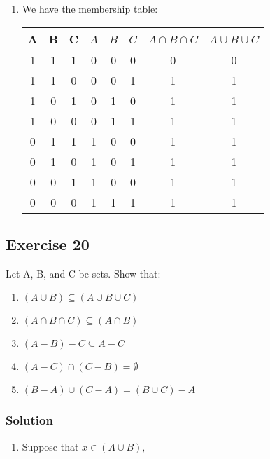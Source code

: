 \documentclass{article}
\theoremstyle{mytheoremstyle}
\theoremstyle{mytheoremstyle}
\theoremstyle{myproblemstyle}
\begin{document}
\begin{enumerate} [label = (\alph*)]
            Because we have proved that \(\overline{A \cap B \cap C} \subseteq \overline{A} \cup \overline{B} \cup \overline{C}\) and \(\overline{A} \cup \overline{B} \cup \overline{C} \subseteq \overline{A \cap B \cap C}\) so that
            we can infer \(\overline{A \cap B \cap C} = \overline{A} \cup \overline{B} \cup \overline{C}\).
            \item We have the membership table:\\
                \begin{center}
                    \begin{tabular}{|c|c|c|c|c|c|c|c|}
                        \hline 
                        A & B & C & \(\overline{A}\) & \(\overline{B}\) & \(\overline{C}\) & \(\overline{A \cap B \cap C}\) & \(\overline{A} \cup \overline{B} \cup \overline{C}\)\\
                        \hline 
                        1 & 1 & 1 & 0 & 0 & 0 & 0 & 0\\
                        \hline
                        1 & 1 & 0 & 0 & 0 & 1 & 1 & 1\\
                        \hline 
                        1 & 0 & 1 & 0 & 1 & 0 & 1 & 1\\
                        \hline
                        1 & 0 & 0 & 0 & 1 & 1 & 1 & 1\\
                        \hline
                        0 & 1 & 1 & 1 & 0 & 0 & 1 & 1\\
                        \hline
                        0 & 1 & 0 & 1 & 0 & 1 & 1 & 1\\
                        \hline
                        0 & 0 & 1 & 1 & 0 & 0 & 1 & 1\\
                        \hline 
                        0 & 0 & 0 & 1 & 1 & 1 & 1 & 1\\
                        \hline
                    \end{tabular}
                \end{center}
        \end{enumerate}
    \subsection*{Exercise 20}
        Let A, B, and C be sets. Show that:
        \begin{enumerate} [label = (\alph*)]
            \item \((A \cup B) \subseteq (A \cup B \cup C)\)
            \item \((A \cap B \cap C) \subseteq (A \cap B)\)
            \item \((A - B) - C \subseteq A - C\)
            \item \((A - C) \cap (C - B) = \emptyset\) 
            \item \((B - A) \cup (C - A) = (B \cup C) - A\)
        \end{enumerate} 
    \subsubsection*{Solution}
        \begin{enumerate} [label = (\alph*)]
            \item Suppose that \(x \in (A \cup B), \)
        \end{enumerate}
\end{document}
